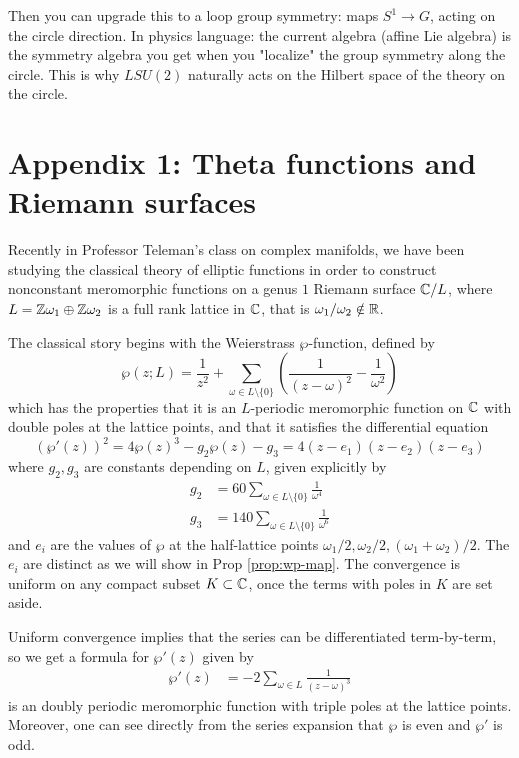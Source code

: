 \documentclass[12pt]{article}
\begin{document}
Then you can upgrade this to a loop group symmetry: maps $S^1 \to G$, acting on the circle direction. In physics language: the current algebra (affine Lie algebra) is the symmetry algebra you get when you "localize" the group symmetry along the circle. This is why $LSU(2)$ naturally acts on the Hilbert space of the theory on the circle.





\section{Appendix 1: Theta functions and Riemann surfaces}
Recently in Professor Teleman's class on complex manifolds, we have been studying the classical theory of elliptic functions in order to construct nonconstant meromorphic functions on a genus $1$ Riemann surface $\mathbb{C}/L$, where $L = \mathbb{Z} \omega_1 \oplus \mathbb{Z} \omega_2$ is a full rank lattice in $\mathbb{C}$, that is $\omega_1/\omega_2 \notin \mathbb{R}$. 

The classical story begins with the Weierstrass $\wp$-function, defined by
\[\wp(z;L) = \frac{1}{z^2} + \sum_{\omega \in L\setminus\{0\}} \left(\frac{1}{(z-\omega)^2} - \frac{1}{\omega^2}\right)\]
which has the properties that it is an $L$-periodic meromorphic function on $\mathbb{C}$ with double poles at the lattice points, and that it satisfies the differential equation
\[(\wp'(z))^2 = 4\wp(z)^3 - g_2\wp(z) - g_3 = 4(z - e_1)(z - e_2)(z - e_3)\]
where $g_2,g_3$ are constants depending on $L$, given explicitly by \begin{align*}
    g_2 & = 60\sum_{\omega \in L\setminus\{0\}} \frac{1}{\omega^4} \\
    g_3 & = 140\sum_{\omega \in L\setminus\{0\}} \frac{1}{\omega^6}
\end{align*} and $e_i$ are the values of $\wp$ at the half-lattice points $\omega_1/2, \omega_2/2, (\omega_1+\omega_2)/2$. The $e_i$ are distinct as we will show in Prop \ref{prop:wp-map}.
The convergence is uniform on any compact subset $K \subset \mathbb{C}$, once the terms with poles in $K$ are set aside.

Uniform convergence implies that the series can be differentiated term-by-term, so we get a formula for $\wp'(z)$ given by \begin{align*}
    \wp'(z) & = -2\sum_{\omega \in L} \frac{1}{(z-\omega)^3}
\end{align*} is an doubly periodic meromorphic function with triple poles at the lattice points. Moreover, one can see directly from the series expansion that $\wp$ is even and $\wp'$ is odd.
\end{document}
